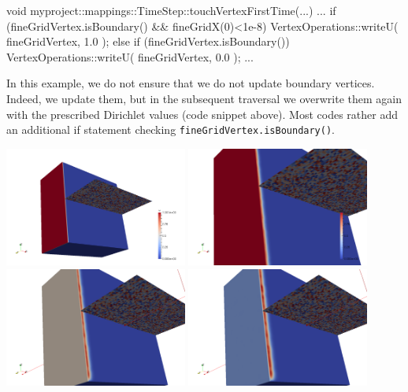 \begin{code}
void myproject::mappings::TimeStep::touchVertexFirstTime(...) {
  ...
  if (fineGridVertex.isBoundary() && fineGridX(0)<1e-8) {
    VertexOperations::writeU( fineGridVertex, 1.0 );
  }
  else if (fineGridVertex.isBoundary()) {
    VertexOperations::writeU( fineGridVertex, 0.0 );
  }
  ...
}
\end{code}

\begin{remark}
In this example, we do not ensure that we do not update boundary vertices.
Indeed, we update them, but in the subsequent traversal we overwrite them again
with the prescribed Dirichlet values (code snippet above). Most codes rather add
an additional if statement checking \texttt{fineGridVertex.isBoundary()}.
\end{remark}

\begin{center}
  \includegraphics[width=0.45\textwidth]{41_heat-equation/solution00.png}
  \includegraphics[width=0.45\textwidth]{41_heat-equation/solution01.png}
  \includegraphics[width=0.45\textwidth]{41_heat-equation/solution02.png}
  \includegraphics[width=0.45\textwidth]{41_heat-equation/solution03.png}
\end{center}


